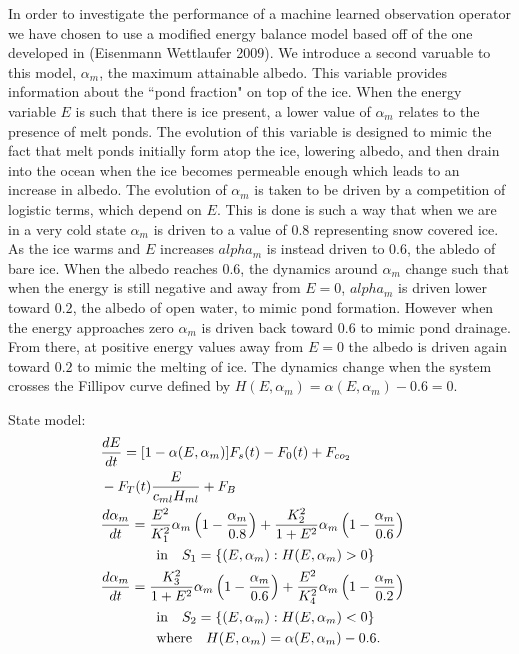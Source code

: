 \documentclass[landscape,a0paper,fontscale=0.3]{baposter} %
\newcommand{\compresslist}{ %
\setlength{\itemsep}{1pt}
\setlength{\parskip}{0pt}
\setlength{\parsep}{0pt}
}
\begin{document}
\begin{poster}
{{\begin{multicols}{2}
In order to investigate the performance of a machine learned observation operator we have chosen to use a modified energy balance model based off of the one developed in (Eisenmann Wettlaufer 2009). We introduce a second varuable to this model, $\alpha_m$, the maximum attainable albedo. This variable provides information about the ``pond fraction" on top of the ice. When the energy variable $E$ is such that there is ice present, a lower value of $\alpha_m$ relates to the presence of melt ponds. The evolution of this variable is designed to mimic the fact that melt ponds initially form atop the ice, lowering albedo, and then drain into the ocean when the ice becomes permeable enough which leads to an increase in albedo. The evolution of $\alpha_m$ is taken to be driven by a competition of logistic terms, which depend on $E$. This is done is such a way that when we are in a very cold state $\alpha_m$ is driven to a value of $0.8$ representing snow covered ice. As the ice warms and $E$ increases $alpha_m$ is instead driven to $0.6$, the abledo of bare ice. When the albedo reaches $0.6$, the dynamics around $\alpha_m$ change such that when the energy is still negative and away from $E=0$, $alpha_m$ is driven lower toward $0.2$, the albedo of open water, to mimic pond formation. However when the energy approaches zero $\alpha_m$ is driven back toward $0.6$ to mimic pond drainage. From there, at positive energy values away from $E=0$ the albedo is driven again toward $0.2$ to mimic the melting of ice. The dynamics change when the system crosses the Fillipov curve defined by $H(E,\alpha_m)=\alpha(E,\alpha_m)-0.6=0$.



State model:
\begin{align*}\compresslist
&\frac{dE}{dt}=[1-\alpha(E,\alpha_{m})]F_s(t)-F_0(t)+F_{co_2}&\nonumber \\&-F_T(t)\frac{E}{c_{ml} H_{ml}}+F_B &\nonumber \\
&\frac{d \alpha_{m}}{dt}= \frac{E^2}{K_1^2}\alpha_{m}\left(1-\frac{\alpha_{m}}{0.8}\right) + \frac{K_2^2}{1+E^2}\alpha_{m}\left(1-\frac{\alpha_{m}}{0.6}\right) &\nonumber \\
&\quad\quad\quad\quad \textrm{in}  \quad S_1=\{(E,\alpha_m): H(E,\alpha_m)>0\} & \\
&\frac{ d \alpha_{m}}{dt}=\frac{K_3^2}{1+E^2}\alpha_{m}\left(1-\frac{\alpha_{m}}{0.6}\right) +\frac{E^2}{K_4^2}\alpha_{m}\left(1-\frac{\alpha_{m}}{0.2}\right) &\nonumber \\
&\quad\quad\quad\quad \textrm{in}  \quad S_2=\{(E,\alpha_m): H(E,\alpha_m)<0\}& \\
&\quad\quad\quad\quad \textrm{where} \quad H(E,\alpha_m)=\alpha(E,\alpha_m)-0.6.
\end{align*}
\end{multicols}

}}
\end{poster}
\end{document}
